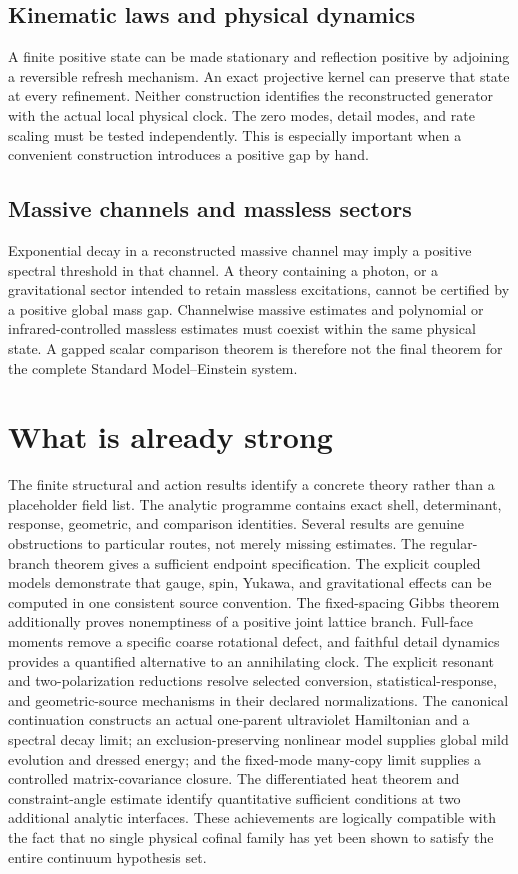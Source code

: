 \documentclass[11pt,a4paper,oneside]{book}
\theoremstyle{plain}
\theoremstyle{definition}
\theoremstyle{remark}
\begin{document}
\subsection{Kinematic laws and physical dynamics}
A finite positive state can be made stationary and reflection positive by adjoining a reversible refresh mechanism. An exact projective kernel can preserve that state at every refinement. Neither construction identifies the reconstructed generator with the actual local physical clock. The zero modes, detail modes, and rate scaling must be tested independently. This is especially important when a convenient construction introduces a positive gap by hand.

\subsection{Massive channels and massless sectors}
Exponential decay in a reconstructed massive channel may imply a positive spectral threshold in that channel. A theory containing a photon, or a gravitational sector intended to retain massless excitations, cannot be certified by a positive global mass gap. Channelwise massive estimates and polynomial or infrared-controlled massless estimates must coexist within the same physical state. A gapped scalar comparison theorem is therefore not the final theorem for the complete Standard Model--Einstein system.

\section{What is already strong}
The finite structural and action results identify a concrete theory rather than a placeholder field list. The analytic programme contains exact shell, determinant, response, geometric, and comparison identities. Several results are genuine obstructions to particular routes, not merely missing estimates. The regular-branch theorem gives a sufficient endpoint specification. The explicit coupled models demonstrate that gauge, spin, Yukawa, and gravitational effects can be computed in one consistent source convention. The fixed-spacing Gibbs theorem additionally proves nonemptiness of a positive joint lattice branch. Full-face moments remove a specific coarse rotational defect, and faithful detail dynamics provides a quantified alternative to an annihilating clock. The explicit resonant and two-polarization reductions resolve selected conversion, statistical-response, and geometric-source mechanisms in their declared normalizations.  The canonical continuation constructs an actual one-parent ultraviolet Hamiltonian and a spectral decay limit; an exclusion-preserving nonlinear model supplies global mild evolution and dressed energy; and the fixed-mode many-copy limit supplies a controlled matrix-covariance closure.  The differentiated heat theorem and constraint-angle estimate identify quantitative sufficient conditions at two additional analytic interfaces.  These achievements are logically compatible with the fact that no single physical cofinal family has yet been shown to satisfy the entire continuum hypothesis set.
\end{document}
